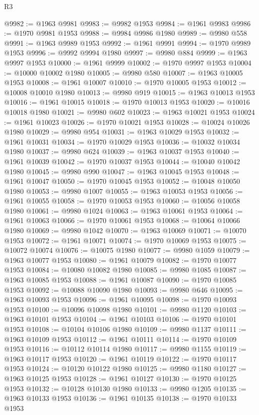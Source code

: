 \begin{lexlean}{R3}
\begin{coremodule}
@9982 := @1963 @9981
@9983 := @9982 @1953
@9984 := @1961 @9983
@9986 := @1970 @9981 @1953
@9988 := @9984 @9986 @1980
@9989 := @9980 @558
@9991 := @1963 @9989 @1953
@9992 := @1961 @9991
@9994 := @1970 @9989 @1953
@9996 := @9992 @9994 @1980
@9997 := @9980 @884
@9999 := @1963 @9997 @1953
@10000 := @1961 @9999
@10002 := @1970 @9997 @1953
@10004 := @10000 @10002 @1980
@10005 := @9980 @580
@10007 := @1963 @10005 @1953
@10008 := @1961 @10007
@10010 := @1970 @10005 @1953
@10012 := @10008 @10010 @1980
@10013 := @9980 @919
@10015 := @1963 @10013 @1953
@10016 := @1961 @10015
@10018 := @1970 @10013 @1953
@10020 := @10016 @10018 @1980
@10021 := @9980 @602
@10023 := @1963 @10021 @1953
@10024 := @1961 @10023
@10026 := @1970 @10021 @1953
@10028 := @10024 @10026 @1980
@10029 := @9980 @954
@10031 := @1963 @10029 @1953
@10032 := @1961 @10031
@10034 := @1970 @10029 @1953
@10036 := @10032 @10034 @1980
@10037 := @9980 @624
@10039 := @1963 @10037 @1953
@10040 := @1961 @10039
@10042 := @1970 @10037 @1953
@10044 := @10040 @10042 @1980
@10045 := @9980 @990
@10047 := @1963 @10045 @1953
@10048 := @1961 @10047
@10050 := @1970 @10045 @1953
@10052 := @10048 @10050 @1980
@10053 := @9980 @1007
@10055 := @1963 @10053 @1953
@10056 := @1961 @10055
@10058 := @1970 @10053 @1953
@10060 := @10056 @10058 @1980
@10061 := @9980 @1024
@10063 := @1963 @10061 @1953
@10064 := @1961 @10063
@10066 := @1970 @10061 @1953
@10068 := @10064 @10066 @1980
@10069 := @9980 @1042
@10070 := @1963 @10069
@10071 := @10070 @1953
@10072 := @1961 @10071
@10074 := @1970 @10069 @1953
@10075 := @10072 @10074
@10076 := @10075 @1980
@10077 := @9980 @1059
@10079 := @1963 @10077 @1953
@10080 := @1961 @10079
@10082 := @1970 @10077 @1953
@10084 := @10080 @10082 @1980
@10085 := @9980 @1085
@10087 := @1963 @10085 @1953
@10088 := @1961 @10087
@10090 := @1970 @10085 @1953
@10092 := @10088 @10090 @1980
@10093 := @9980 @646
@10095 := @1963 @10093 @1953
@10096 := @1961 @10095
@10098 := @1970 @10093 @1953
@10100 := @10096 @10098 @1980
@10101 := @9980 @1120
@10103 := @1963 @10101 @1953
@10104 := @1961 @10103
@10106 := @1970 @10101 @1953
@10108 := @10104 @10106 @1980
@10109 := @9980 @1137
@10111 := @1963 @10109 @1953
@10112 := @1961 @10111
@10114 := @1970 @10109 @1953
@10116 := @10112 @10114 @1980
@10117 := @9980 @1155
@10119 := @1963 @10117 @1953
@10120 := @1961 @10119
@10122 := @1970 @10117 @1953
@10124 := @10120 @10122 @1980
@10125 := @9980 @1180
@10127 := @1963 @10125 @1953
@10128 := @1961 @10127
@10130 := @1970 @10125 @1953
@10132 := @10128 @10130 @1980
@10133 := @9980 @1205
@10135 := @1963 @10133 @1953
@10136 := @1961 @10135
@10138 := @1970 @10133 @1953

\end{coremodule}
\end{lexlean}
